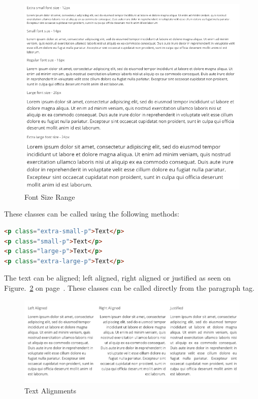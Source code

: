\begin{figure}[h]
\centering
\includegraphics[scale=0.3]{images/fontsizes}
	\caption{Font Size Range}
 	\label{fig:fontSize}
\end{figure}

These classes can be called using the following methods: 

\begin{lstlisting}[language=HTML]
<p class="extra-small-p">Text</p>      
<p class="small-p">Text</p>      
<p class="large-p">Text</p>       
<p class="extra-large-p">Text</p>
\end{lstlisting}

The text can be aligned; left aligned, right aligned or justified as seen on Figure.~\ref{fig:textalign} on  page~\pageref{fig:textalign}. These classes can be called directly from the paragraph tag.

\begin{figure}[h]
\centering
\includegraphics[scale=0.2]{images/text-align}
	\caption{Text Alignments}
    \label{fig:textalign}
\end{figure}

